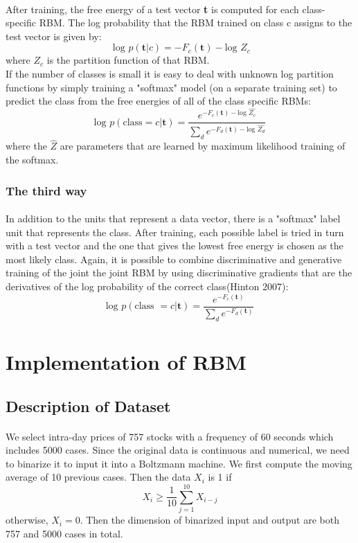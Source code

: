 \documentclass{article}
\begin{document}
\paragraph{}
After training, the free energy of a test vector \textbf{t} is computed for each class-specific RBM. The log probability that the RBM trained on class c assigns to the test vector is given by:
\[\text{ log }p(\textbf{t}|c)=-F_c(\textbf{t})-\text{log }Z_c\]
where $Z_c$ is the partition function of that RBM.\\
If the number of classes is small it is easy to deal with unknown log partition functions by simply training a "softmax" model (on a separate training set) to predict the class from the free energies of all of the class specific RBMs:
\[\text{log }p(\text{class} =c|\textbf{t})=\frac{e^{-F_c(\textbf{t})-\text{log }\hat{Z_c}}}{\sum\limits_de^{-F_d(\textbf{t})-\text{log }\hat{Z_d}}}\]
where the $\hat{Z}$ are parameters that are learned by maximum likelihood training of the softmax.
\subsubsection{The third way}
\paragraph{}
In addition to the units that represent a data vector, there is a "softmax" label unit that represents the class. After training, each possible label is tried in turn with a test vector and the one that gives the lowest free energy is chosen as the most likely class. Again, it is possible to combine discriminative and generative training of the joint the joint RBM by using discriminative gradients that are the derivatives of the log probability of the correct class(Hinton 2007):
\[\text{log }p(\text{class }=c|\textbf{t})=\frac{e^{-F_c(\textbf{t})}}{\sum_d\limits e^{-F_d(\textbf{t})}}\]


\clearpage
\section{Implementation of RBM}
\subsection{Description of Dataset}
\paragraph{}We select intra-day prices of 757 stocks with a frequency of 60 seconds which includes 5000 cases. Since the original data is continuous and numerical, we need to binarize it to input it into a Boltzmann machine. We first compute the moving average of 10 previous cases. Then the data $X_i$ is 1 if
\[X_i\geq \frac 1{10}\sum_{j=1}^{10}X_{i-j}\]
otherwise, $X_i=0$. Then the dimension of binarized input and output are both 757 and 5000 cases in total.
\end{document}
